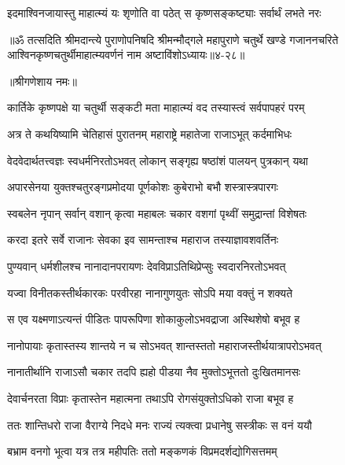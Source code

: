 \twolineshloka
{इदमाश्विनजायास्तु माहात्म्यं यः श‍ृणोति वा}
{पठेत् स कृष्णसङ्कष्ट्याः सर्वार्थं लभते नरः} %

॥ॐ तत्सदिति श्रीमदान्त्ये पुराणोपनिषदि श्रीमन्मौद्गले महापुराणे चतुर्थे खण्डे गजाननचरिते आश्विनकृष्णचतुर्थीमाहात्म्यवर्णनं नाम अष्टाविंशोऽध्यायः॥४-२८॥


\label{sec:kartika-krishna-chaturthi-mahatmya-varnanam}

\centerline{॥श्रीगणेशाय नमः॥}


\twolineshloka
{कार्तिके कृष्णपक्षे या चतुर्थी सङ्कटी मता}
{माहात्म्यं वद तस्यास्त्वं सर्वपापहरं परम्} %


\twolineshloka
{अत्र ते कथयिष्यामि चेतिहासं पुरातनम्}
{महाराष्ट्रे महातेजा राजाऽभूत् कर्दमाभिधः} %

\twolineshloka
{वेदवेदार्थतत्त्वज्ञः स्वधर्मनिरतोऽभवत्}
{लोकान् सङ्गृह्य षष्ठांशं पालयन् पुत्रकान् यथा} %

\twolineshloka
{अपारसेनया युक्तश्चतुरङ्गप्रमोदया}
{पूर्णकोशः कुबेराभो बभौ शस्त्रास्त्रपारगः} %

\twolineshloka
{स्वबलेन नृपान् सर्वान् वशान् कृत्वा महाबलः}
{चकार वशगां पृथ्वीं समुद्रान्तां विशेषतः} %

\twolineshloka
{करदा इतरे सर्वे राजानः सेवका इव}
{सामन्ताश्च महाराज तस्याज्ञावशवर्तिनः} %

\twolineshloka
{पुण्यवान् धर्मशीलश्च नानादानपरायणः}
{देवविप्राऽतिथिप्रेप्सुः स्वदारनिरतोऽभवत्} %

\twolineshloka
{यज्वा विनीतकस्तीर्थकारकः परवीरहा}
{नानागुणयुतः सोऽपि मया वक्तुं न शक्यते} %

\twolineshloka
{स एव यक्ष्मणाऽत्यन्तं पीडितः पापरूपिणा}
{शोकाकुलोऽभवद्राजा अस्थिशेषो बभूव ह} %

\twolineshloka
{नानोपायाः कृतास्तस्य शान्तये न च सोऽभवत्}
{शान्तस्ततो महाराजस्तीर्थयात्रापरोऽभवत्} %

\twolineshloka
{नानातीर्थानि राजाऽसौ चकार तदपि ह्यहो}
{पीडया नैव मुक्तोऽभूत्ततो दुःखितमानसः} %

\twolineshloka
{देवार्चनरता विप्राः कृतास्तेन महात्मना}
{तथाऽपि रोगसंयुक्तोऽधिको राजा बभूव ह} %

\twolineshloka
{ततः शान्तिधरो राजा वैराग्ये निदधे मनः}
{राज्यं त्यक्त्वा प्रधानेषु सस्त्रीकः स वनं ययौ} %

\twolineshloka
{बभ्राम वनगो भूत्वा यत्र तत्र महीपतिः}
{ततो मङ्कणकं विप्रमदर्शद्योगिसत्तमम्} %

